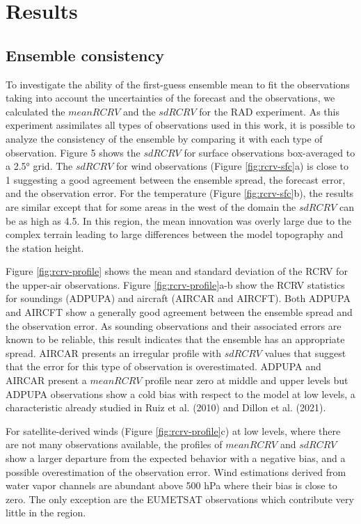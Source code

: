 \documentclass[final,5p,times,twocolumn,authoryear]{elsarticle} %
\begin{document}
\hypertarget{results}{%
\section{Results}\label{results}}

\hypertarget{ensemble-consistency}{%
\subsection{Ensemble consistency}\label{ensemble-consistency}}

To investigate the ability of the first-guess ensemble mean to fit the observations taking into account the uncertainties of the forecast and the observations, we calculated the \(mean RCRV\) and the \(sd RCRV\) for the RAD experiment. As this experiment assimilates all types of observations used in this work, it is possible to analyze the consistency of the ensemble by comparing it with each type of observation. Figure 5 shows the \(sd RCRV\) for surface observations box-averaged to a 2.5° grid. The \(sd RCRV\) for wind observations (Figure \ref{fig:rcrv-sfc}a) is close to 1 suggesting a good agreement between the ensemble spread, the forecast error, and the observation error. For the temperature (Figure \ref{fig:rcrv-sfc}b), the results are similar except that for some areas in the west of the domain the \(sd RCRV\) can be as high as 4.5. In this region, the mean innovation was overly large due to the complex terrain leading to large differences between the model topography and the station height.

Figure \ref{fig:rcrv-profile} shows the mean and standard deviation of the RCRV for the upper-air observations. Figure \ref{fig:rcrv-profile}a-b show the RCRV statistics for soundings (ADPUPA) and aircraft (AIRCAR and AIRCFT). Both ADPUPA and AIRCFT show a generally good agreement between the ensemble spread and the observation error. As sounding observations and their associated errors are known to be reliable, this result indicates that the ensemble has an appropriate spread. AIRCAR presents an irregular profile with \(sd RCRV\) values that suggest that the error for this type of observation is overestimated. ADPUPA and AIRCAR present a \(mean RCRV\) profile near zero at middle and upper levels but ADPUPA observations show a cold bias with respect to the model at low levels, a characteristic already studied in Ruiz et al. (2010) and Dillon et al. (2021).

For satellite-derived winds (Figure \ref{fig:rcrv-profile}c) at low levels, where there are not many observations available, the profiles of \(mean RCRV\) and \(sd RCRV\) show a larger departure from the expected behavior with a negative bias, and a possible overestimation of the observation error. Wind estimations derived from water vapor channels are abundant above 500 hPa where their bias is close to zero. The only exception are the EUMETSAT observations which contribute very little in the region.
\end{document}
